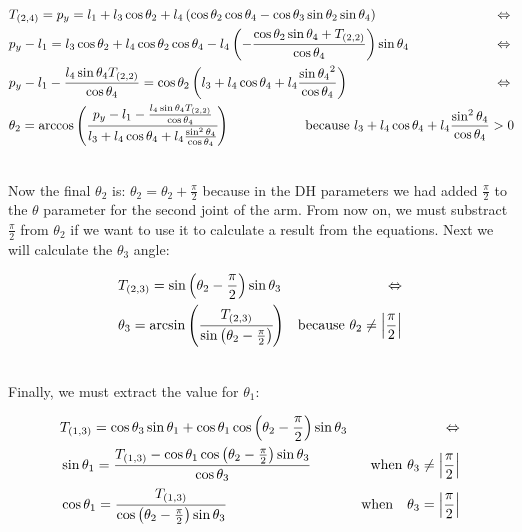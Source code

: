 \begin{small}
\begin{align*}
&T_{(2,4)} = p_y = l_1 + l_3\cos\theta_2 + l_4\left(\cos\theta_2\cos\theta_4 - \cos\theta_3\sin\theta_2\sin\theta_4\right)&\Leftrightarrow\\
&p_y - l_1 =l_3\cos\theta_2 + l_4\cos\theta_2\cos\theta_4 - l_4\left(-\frac{\cos\theta_2\sin\theta_4 + T_{(2,2)}}{\cos\theta_4}\right)\sin\theta_4&\Leftrightarrow\\
&p_y - l_1 - \frac{l_4\sin\theta_4 T_{(2,2)}}{\cos\theta_4} = \cos\theta_2\left(l_3 + l_4\cos\theta_4 + l_4\frac{{\sin\theta_4}^2}{\cos\theta_4}\right)&\Leftrightarrow\\
&\theta_2 = \arccos\left(\cfrac{p_y - l_1 - \frac{l_4\sin\theta_4 T_{(2,2)}}{\cos\theta_4}}{l_3 + l_4\cos\theta_4 + l_4\frac{\sin^2\theta_4}{\cos\theta_4}}\right) \hspace{2cm} \text{because }   l_3 + l_4\cos\theta_4 + l_4\frac{\sin^2\theta_4}{\cos\theta_4}>0 \hspace{-0.8cm}
\end{align*}
\end{small}\\
Now the final \(\theta_2\) is: \(\theta_2 = \theta_2 + \frac{\pi}{2}\) because in the DH parameters we had added \(\frac{\pi}{2}\) to the \(\theta\) parameter for the second joint of the arm. From now on, we must substract \(\frac{\pi}{2}\) from \(\theta_2\) if we want to use it to calculate a result from the equations. Next we will calculate the $\theta_3$ angle:
\begin{small}
\begin{align*}
&T_{(2,3)} = \sin\left(\theta_2 - \frac{\pi}{2}\right)\sin\theta_3 &\Leftrightarrow \\
& \theta_3 = \arcsin\left( \cfrac{ T_{(2,3)} }{ \sin\left(\theta_2-\frac{\pi}{2}\right)}\right)  &\text{because }    \theta_2 \neq \left|\frac{\pi}{2}\right|
\end{align*}
\end{small}\\
Finally, we must extract the value for \(\theta_1\):
\begin{small}
\begin{align*}
&T_{(1,3)} = \cos\theta_3\sin\theta_1 + \cos\theta_1\cos\left(\theta_2 - \frac{\pi}{2}\right)\sin\theta_3 &\Leftrightarrow \\
&\sin\theta_1 = \cfrac{T_{(1,3)} - \cos\theta_1\cos\left(\theta_2 - \frac{\pi}{2}\right)\sin\theta_3}{\cos\theta_3}  &\text{when } \theta_3 \neq \left|\frac{\pi}{2}\right|\\
&\cos\theta_1 = \cfrac{T_{(1,3)}}{\cos\left(\theta_2 - \frac{\pi}{2}\right)\sin\theta_3}  &\text{when} \quad \theta_3 = \left|\frac{\pi}{2}\right|
\end{align*}
\end{small}\\
